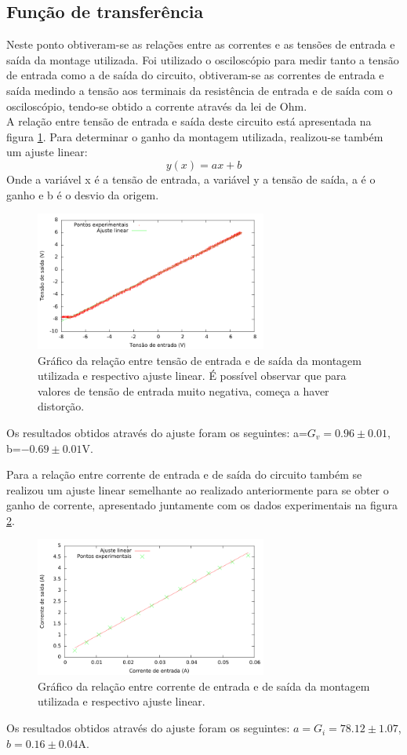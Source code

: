 \documentclass[%
  reprint,
  nofootinbib,
  amsmath,amssymb,
  aps,
  10pt,
  a4paper
]{revtex4-1}
\begin{document}
\subsection{Função de transferência}
Neste ponto obtiveram-se as relações entre as correntes e as tensões de entrada e saída da montage utilizada. Foi utilizado o osciloscópio para medir tanto a tensão de entrada como a de saída do circuito, obtiveram-se as correntes de entrada e saída medindo a tensão aos terminais da resistência de entrada e de saída com o osciloscópio, tendo-se obtido a corrente através da lei de Ohm.\\
A relação entre tensão de entrada e saída deste circuito está apresentada na figura \ref{fig:v_rel}. Para determinar o ganho da montagem utilizada, realizou-se também um ajuste linear:
\begin{equation}
y(x)=ax+b
\end{equation}
Onde a variável x é a tensão de entrada, a variável y a tensão de saída, a é o ganho e b é o desvio da origem.
\begin{figure}
\includegraphics[width=3in]{v_rel.pdf}
\caption{Gráfico da relação entre tensão de entrada e de saída da montagem utilizada e respectivo ajuste linear. É possível observar que para valores de tensão de entrada muito negativa, começa a haver distorção.}
\label{fig:v_rel}
\end{figure}
Os resultados obtidos através do ajuste foram os seguintes: a=$G_v=0.96\pm0.01$, b=$-0.69\pm0.01$V.

Para a relação entre corrente de entrada e de saída do circuito também se realizou um ajuste linear semelhante ao realizado anteriormente para se obter o ganho de corrente, apresentado juntamente com os dados experimentais na figura \ref{fig:curr_rel}.
\begin{figure}
\includegraphics[width=3in]{curr_rel.pdf}
\caption{Gráfico da relação entre corrente de entrada e de saída da montagem utilizada e respectivo ajuste linear.}
\label{fig:curr_rel}
\end{figure}
Os resultados obtidos através do ajuste foram os seguintes: $a=G_i=78.12\pm1.07$, $b=0.16\pm0.04$A. 
\end{document}
